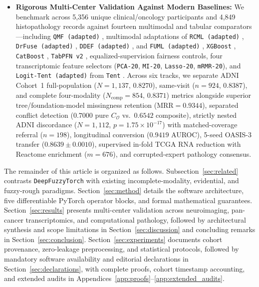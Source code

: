 \documentclass[10pt,twocolumn]{article}
\begin{document}
\begin{itemize}[leftmargin=1.3em,itemsep=1pt,topsep=2pt]
    float32 dictionaries and $2.384 \times 10^{-7}$ ($\le 2.39 \times 10^{-7}$) when parsed
    directly from human-readable 8-decimal \texttt{IF--THEN} text rules via
    \texttt{evaluate\_\allowbreak exported\_\allowbreak rules\_\allowbreak text()}.
    \item \textbf{Rigorous Multi-Center Validation Against Modern Baselines:} We benchmark
    across 5,356 unique clinical/oncology participants and 4,849 histopathology records against
    fourteen multimodal and tabular comparators---including \texttt{QMF (adapted)}
    \cite{zhang2023provable},
    multimodal adaptations of \texttt{RCML (adapted)} \cite{xu2024reliable},
    \texttt{DrFuse (adapted)}
    \cite{yao2024drfuse}, \texttt{DDEF (adapted)} \cite{shao2024dual}, and \texttt{FUML
    (adapted)}
    \cite{duan2025fuml}, \texttt{XGBoost} \cite{chen2016xgboost}, \texttt{CatBoost}
    \cite{prokhorenkova2018catboost}, \texttt{TabPFN~v2} \cite{hollmann2025tabpfn},
    equalized-supervision fairness controls, four transcriptomic feature selectors
    (\texttt{PCA-20}, \texttt{MI-20}, \texttt{Lasso-20}, \texttt{mRMR-20}), and
    \texttt{Logit-Tent (adapted)} from \texttt{Tent} \cite{wang2021tent}. Across six tracks, we
    separate ADNI Cohort~1 full-population ($N=1,137$, $0.8270$), same-visit ($n=924$,
    $0.8387$), and complete four-modality ($N_{\text{comp}}=854$, $0.8371$) metrics alongside
    superior tree/foundation-model missingness retention ($\text{MRR}=0.9344$), separated
    conflict detection ($0.7000$ pure $C_{\mathcal{O}}$ vs.\ $0.6542$ composite), strictly
    nested
    ADNI discordance ($N=1,112$, $p=1.75\times 10^{-17}$) with matched-coverage referral
    ($n=198$), longitudinal conversion ($0.9419$ AUROC), 5-seed OASIS-3 transfer ($0.8639\pm
    0.0010$), supervised in-fold TCGA RNA reduction with Reactome enrichment ($m=676$), and
    corrupted-expert pathology consensus.
\end{itemize}

The remainder of this article is organized as follows. Subsection~\ref{sec:related} contrasts
\texttt{DeepFuzzyTorch} with existing incomplete-modality, evidential, and fuzzy-rough
paradigms. Section~\ref{sec:method} details the software architecture, five differentiable
PyTorch operator blocks, and formal mathematical guarantees. Section~\ref{sec:results} presents
multi-center validation across neuroimaging, pan-cancer transcriptomics, and computational
pathology, followed by architectural synthesis and scope limitations in
Section~\ref{sec:discussion} and concluding remarks in Section~\ref{sec:conclusion}.
Section~\ref{sec:experiments} documents cohort provenance, zero-leakage preprocessing, and
statistical protocols, followed by mandatory software availability and editorial declarations
in Section~\ref{sec:declarations}, with complete proofs, cohort timestamp accounting, and
extended audits in Appendices~\ref{app:proofs}--\ref{app:extended_audits}.
\end{document}
